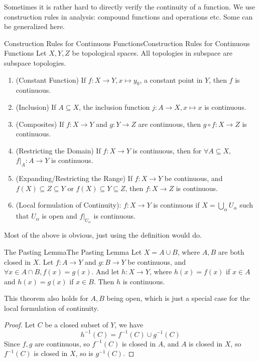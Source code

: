 \documentclass[../main.tex]{subfiles}
\begin{document}
Sometimes it is rather hard to directly verify the continuity of a function. We use construction rules in analysis: compound functions and operations etc. Some can be generalized here.

\begin{theorem}{Construction Rules for Continuous Functions}{Construction Rules for Continuous Functions}
Let $X,Y,Z$ be topological spaces. All topologies in subspace are subspace topologies.
\begin{enumerate}
	\item (Constant Function) If $f: X \rightarrow Y, x \mapsto y_0$, a constant point in $Y$, then $f$ is continuous.
	\item (Inclusion) If $A \subseteq X$, the inclusion function $j:A \rightarrow X, x \mapsto x$ is continuous.
	\item (Composites) If $f:X \rightarrow Y$ and $g:Y \rightarrow Z$ are continuous, then $g \circ f: X \rightarrow Z$ is continuous.
	\item (Restricting the Domain) If $f: X \rightarrow Y$ is continuous, then for $\forall A \subseteq X$, $f|_A: A \rightarrow Y$ is continuous.
	\item (Expanding/Restricting the Range) If $f:X \rightarrow Y$ be continuous, and $f(X) \subseteq Z \subseteq Y$ or $f(X) \subseteq Y \subseteq Z$, then $f: X \rightarrow Z$ is continuous.
	\item (Local formulation of Continuity): $f:X \rightarrow Y$ is continuous if $X = \bigcup_{\alpha} U_{\alpha}$ such that $U_{\alpha}$ is open and $f|_{U_{\alpha}}$ is continuous.
\end{enumerate}
\end{theorem}

Most of the above is obvious, just using the definition would do.

\begin{theorem}{The Pasting Lemma}{The Pasting Lemma}
Let $X = A \cup B$, where $A,B$ are both closed in $X$. Let $f:A \rightarrow Y$ and $g:B \rightarrow Y$ be continuous, and $\forall x\in A\cap B, f(x)=g(x)$. And let $h: X \rightarrow Y$, where $h(x) = f(x)$ if $x\in A$ and $h(x)=g(x)$ if $x\in  B$. Then $h$ is continuous.

This theorem also holds for $A,B$ being open, which is just a special case for the local formulation of continuity.
\end{theorem}

\begin{proof}
Let $C$ be a closed subset of $Y$, we have
\begin{equation*}
h^{-1}(C) = f^{-1}(C) \cup g^{-1}(C)
\end{equation*}
Since $f,g$ are continuous, so $f^{-1}(C)$ is closed in $A$, and $A$ is closed in $X$, so $f^{-1}(C)$ is closed in $X$, so is $g^{-1}(C)$.
\end{proof}
\end{document}
